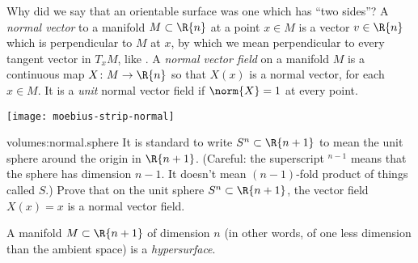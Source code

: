 Why did we say that an orientable surface was one which has ``two sides''? 
A \emph{normal vector}%
to a manifold \(M \subset \R{n}\) at a point \(x \in M\) is a vector \(v \in \R{n}\) which is perpendicular to \(M\) at \(x\), by which we mean perpendicular to every tangent vector in \(T_x M\), like .
A \emph{normal vector field}%
on a manifold \(M\) is a continuous map \(X \colon M \to \R{n}\) so that \(X(x)\) is a normal vector, for each \(x \in M\).
It is a \emph{unit} normal vector field if \(\norm{X}=1\) at every point.
\begin{center}
\texttt{[image: moebius-strip-normal]}
%
\end{center}

\begin{marginfigure}
\centering

\end{marginfigure}

\begin{problem}{volumes:normal.sphere}
It is standard to write \(S^n \subset \R{n+1}\)%
 to mean the unit sphere around the origin in \(\R{n+1}\). 
(Careful: the superscript \({}^{n-1}\) means that the sphere has dimension \(n-1\).
It doesn't mean \((n-1)\)-fold product of things called \(S\).)
Prove that on the unit sphere \(S^n \subset \R{n+1}\), the vector field \(X(x)=x\) is a normal vector field.
\end{problem}

A manifold \(M \subset \R{n+1}\) of dimension \(n\) (in other words, of one less dimension than the ambient space) is a \emph{hypersurface}.%

